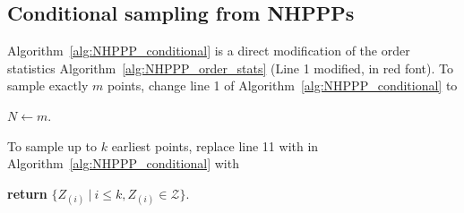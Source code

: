 \documentclass[article,nojss]{jss}\usepackage[]{graphicx}\usepackage[]{xcolor}
\begin{document}
\begin{appendix}
\section{Conditional sampling from NHPPPs} \label{app:conditional_sampling}
Algorithm~\ref{alg:NHPPP_conditional} is a direct modification of the order statistics Algorithm~\ref{alg:NHPPP_order_stats} (Line 1 modified, in red font).
To sample exactly $m$ points, change line 1 of Algorithm~\ref{alg:NHPPP_conditional} to
\begin{center}
$N \gets m$.
\end{center}
To sample up to $k$ earliest points, replace line 11 with in Algorithm~\ref{alg:NHPPP_conditional} with
\begin{center}
\textbf{return} {$\{Z_{(i)} \ | \ i \le k, Z_{(i)} \in \mathcal{Z}\}$}.
\end{center}









\end{appendix}
\newpage
\end{document}

